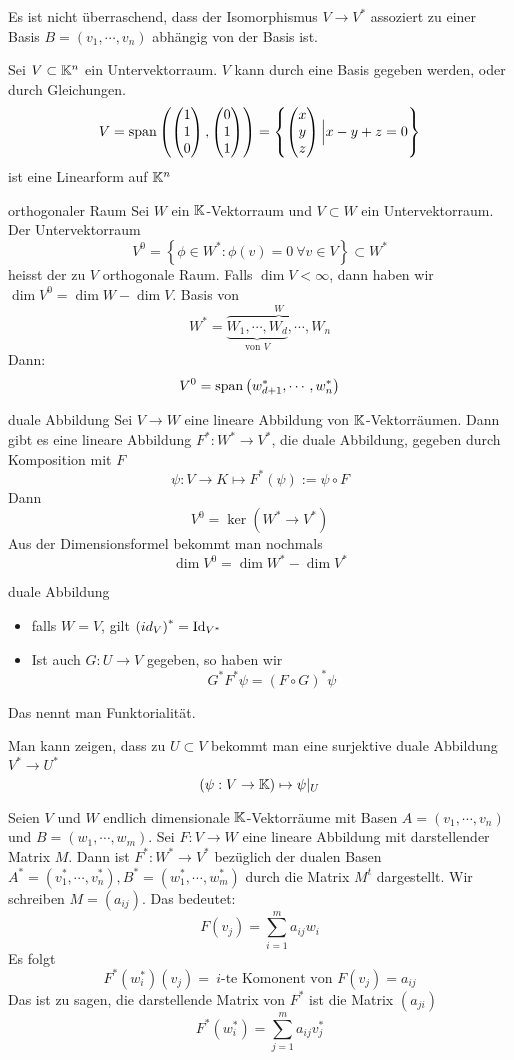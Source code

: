 \begin{Bem}
  Es ist nicht überraschend, dass der Isomorphismus $V\to V^*$ assoziert zu einer Basis $B=(v_1,\cdots,v_n)$ abhängig von der Basis ist.
\end{Bem}
\begin{Bem}
  Sei $V\subset\mathbb{K}^n$ ein Untervektorraum. $V$ kann durch eine Basis gegeben werden, oder durch Gleichungen.
  \[V=\operatorname{span}\left( \begin{pmatrix}1\\1\\0\end{pmatrix},\begin{pmatrix}0\\1\\1\end{pmatrix} \right)=\left\{ \begin{pmatrix}x\\y\\z\end{pmatrix}\Big| x-y+z=0 \right\}\]
  ist eine Linearform auf $\mathbb{K}^n$
\end{Bem}
\begin{Def}{orthogonaler Raum}
  Sei $W$ ein $\mathbb{K}$-Vektorraum und $V\subset W$ ein Untervektorraum. Der Untervektorraum
  \[V^0=\left\{ \phi\in W^*:\phi(v)=0\ \forall v\in V \right\}\subset W^*\]
  heisst der zu $V$ orthogonale Raum. Falls $\dim V<\infty$, dann haben wir $\dim V^0=\dim W - \dim V$. Basis von \[W^* =\overbrace{\underbrace{W_1,\cdots,W_d}_{\text{von }V},\cdots,W_n}^{W}\]
  Dann:
  \[V^0=\operatorname{span}\left( w_{d+1}^*,\cdots,w_n^* \right)\]
\end{Def}
\begin{Def}{duale Abbildung}
  Sei $V\to W$ eine lineare Abbildung von $\mathbb{K}$-Vektorräumen. Dann gibt es eine lineare Abbildung $F^*:W^*\to V^*$, die duale Abbildung, gegeben durch Komposition mit $F$
  \[\psi:V\to K\mapsto F^*(\psi):=\psi \circ F\]
  Dann
  \[V^0=\ker\left( W^*\to V^* \right)\]
  Aus der Dimensionsformel bekommt man nochmals
  \[\dim V^0=\dim W^*-\dim V^*\]
\end{Def}
\begin{Eig}{duale Abbildung}
  \begin{itemize}
    \item falls $W=V$, gilt $\left( id_V \right)^*=\operatorname{Id}_{V^*}$
    \item Ist auch $G:U\to V$ gegeben, so haben wir \[G^*F^*\psi=\left( F\circ G \right)^*\psi\]
  \end{itemize}
  Das nennt man Funktorialität.
\end{Eig}
\begin{Bem}
  Man kann zeigen, dass zu $U\subset V$ bekommt man eine surjektive duale Abbildung $V^*\to U^*$ \[\left( \psi:V\to \mathbb{K} \right)\mapsto \psi|_U\]
\end{Bem}
\begin{Prop}
  Seien $V$ und $W$ endlich dimensionale $\mathbb{K}$-Vektorräume mit Basen $A=(v_1,\cdots,v_n)$ und $B=(w_1,\cdots,w_m)$. Sei $F:V\to W$ eine lineare Abbildung mit darstellender Matrix $M$. Dann ist $F^*:W^*\to V^*$ bezüglich der dualen Basen $A^*=(v_1^*,\cdots,v_n^*), B^*=(w^*_1,\cdots,w_m^*)$ durch die Matrix $M^t$ dargestellt. Wir schreiben $M=(a_{ij})$. Das bedeutet:
  \[F(v_j)=\sum_{i=1}^ma_{ij}w_i\]
  Es folgt 
  \[F^*(w_i^*)(v_j)=\ \text{$i$-te Komonent von } F(v_j)=a_{ij}\]
  Das ist zu sagen, die darstellende Matrix von $F^*$ ist die Matrix $(a_{ji})$
  \[F^*(w_i^*)=\sum^m_{j=1}a_{ij}v^*_j\]
\end{Prop}
